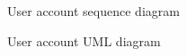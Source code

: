 \documentclass{article}
\begin{document}
\begin{figure}[H]
    \centering
    \begin{center}
    \end{center}
    \caption{User account sequence diagram}
    \label{fig:my_label}
\end{figure}

\begin{figure}[H]
    \centering
    \begin{center}
    \end{center}
    \caption{User account UML diagram}
    \label{fig:my_label}
\end{figure}
\end{document}
